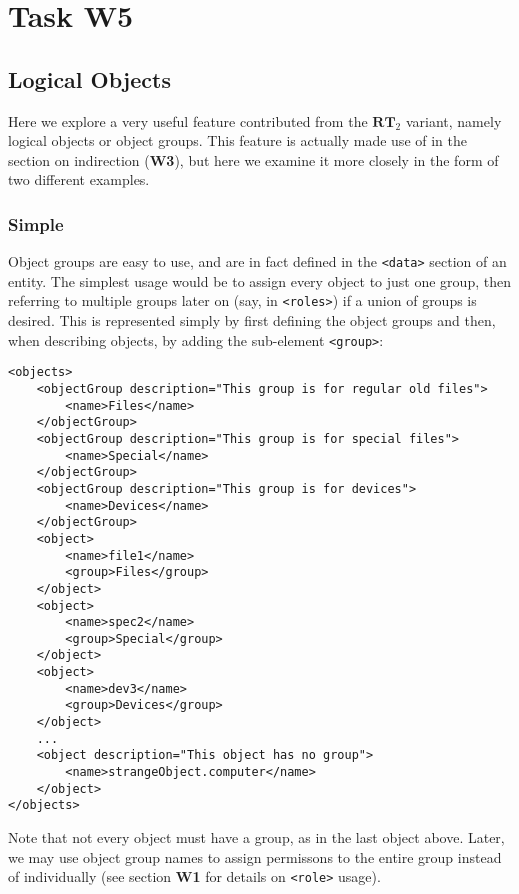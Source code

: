 \documentclass{article}
\providecommand{\task}[1]{\section{Task #1}}
\providecommand{\inlinecode}{\texttt}
\providecommand{\RT}{\textbf{RT}}
\begin{document}
\task{W5}
\subsection{Logical Objects}
Here we explore a very useful feature contributed from the $\RT_2$ variant, namely logical objects or object groups. This feature is actually made use of in the section on indirection (\textbf{W3}), but here we examine it more closely in the form of two different examples. \par

\subsubsection{Simple}
Object groups are easy to use, and are in fact defined in the \inlinecode{<data>} section of an entity. The simplest usage would be to assign every object to just one group, then referring to multiple groups later on (say, in \inlinecode{<roles>}) if a union of groups is desired. This is represented simply by first defining the object groups and then, when describing objects, by adding the sub-element \inlinecode{<group>}:
\begin{lstlisting}
<objects>
    <objectGroup description="This group is for regular old files">
        <name>Files</name>
    </objectGroup>
    <objectGroup description="This group is for special files">
        <name>Special</name>
    </objectGroup>
    <objectGroup description="This group is for devices">
        <name>Devices</name>
    </objectGroup>
    <object>
        <name>file1</name>
        <group>Files</group>
    </object>
    <object>
        <name>spec2</name>
        <group>Special</group>
    </object>
    <object>
        <name>dev3</name>
        <group>Devices</group>
    </object>
    ...
    <object description="This object has no group">
        <name>strangeObject.computer</name>
    </object>
</objects>
\end{lstlisting}
Note that not every object must have a group, as in the last object above. Later, we may use object group names to assign permissons to the entire group instead of individually (see section \textbf{W1} for details on \inlinecode{<role>} usage).
\end{document}
